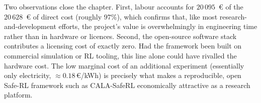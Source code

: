 Two observations close the chapter. First, labour accounts for \(20\,095\)~€ of the
\(20\,628\)~€ of direct cost (roughly \(97\%\)), which confirms that, like most
research-and-development efforts, the project's value is overwhelmingly in engineering time rather
than in hardware or licences. Second, the open-source software stack contributes a licensing cost
of exactly zero. Had the framework been built on commercial simulation or RL tooling, this line
alone could have rivalled the hardware cost. The low marginal cost of an additional experiment
(essentially only electricity, \(\approx 0.18\)\,€/kWh) is precisely what makes a reproducible,
open Safe-RL framework such as CALA-SafeRL economically attractive as a research platform.

\clearpage
